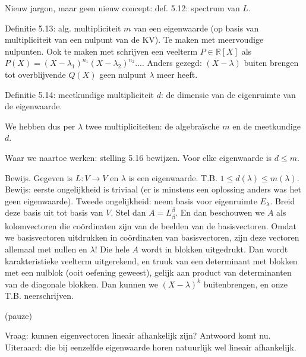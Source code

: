 \documentclass{article}
\begin{document}
Nieuw jargon, maar geen nieuw concept: def. 5.12: spectrum van $L$. 

Definitie 5.13: alg. multipliciteit $m$ van een eigenwaarde (op basis van multipliciteit van een nulpunt van de KV). Te maken met meervoudige nulpunten. Ook te maken met schrijven een veelterm $P \in \mathbb{R}[X]$ als $P(X) = (X-\lambda_1)^{n_1}(X-\lambda_2)^{n_2} ...$. Anders gezegd: $(X-\lambda)$ buiten brengen tot overblijvende $Q(X)$ geen nulpunt $\lambda$ meer heeft. 

Definitie 5.14: meetkundige multipliciteit $d$: de dimensie van de eigenruimte van de eigenwaarde. 

We hebben dus per $\lambda$ twee multipliciteiten: de algebra\"ische $m$ en de meetkundige $d$. 

Waar we naartoe werken: stelling 5.16 bewijzen. Voor elke eigenwaarde is $d \leq m$. 

Bewijs. Gegeven is $L: V \to V$ en $\lambda$ is een eigenwaarde. T.B. $1 \leq d(\lambda) \leq m(\lambda)$. 
Bewijs: eerste ongelijkheid is triviaal (er is minstens een oplossing anders was het geen eigenwaarde). Tweede ongelijkheid: neem basis voor eigenruimte $E_\lambda$. Breid deze basis uit tot basis van $V$. Stel dan $A=L_\beta^\beta$. En dan beschouwen we $A$ als kolomvectoren die co\"ordinaten zijn van de beelden van de basisvectoren. Omdat we basisvectoren uitdrukken in co\"ordinaten van basisvectoren, zijn deze vectoren allemaal met nullen en $\lambda$! Die hele $A$ wordt in blokken uitgedrukt. Dan wordt karakteristieke veelterm uitgerekend, en truuk van een determinant met blokken met een nulblok (ooit oefening geweest), gelijk aan product van determinanten van de diagonale blokken. Dan kunnen we $(X-\lambda)^k$ buitenbrengen, en onze T.B.  neerschrijven. 

(pauze) 

Vraag: kunnen eigenvectoren lineair afhankelijk zijn? Antwoord komt nu. Uiteraard: die bij eenzelfde eigenwaarde horen natuurlijk wel lineair afhankelijk.
\end{document}
